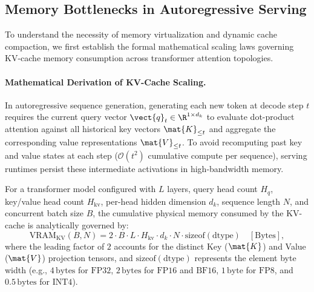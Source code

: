 \subsection{Memory Bottlenecks in Autoregressive Serving}
\label{sec:serving_memory_bottlenecks}

To understand the necessity of memory virtualization and dynamic cache compaction, we first establish the formal mathematical scaling laws governing KV-cache memory consumption across transformer attention topologies.

\paragraph{Mathematical Derivation of KV-Cache Scaling.}
In autoregressive sequence generation, generating each new token at decode step $t$ requires the current query vector $\vect{q}_t \in \R^{1 \times d_k}$ to evaluate dot-product attention against all historical key vectors $\mat{K}_{\le t}$ and aggregate the corresponding value representations $\mat{V}_{\le t}$. To avoid recomputing past key and value states at each step ($\mathcal{O}(t^2)$ cumulative compute per sequence), serving runtimes persist these intermediate activations in high-bandwidth memory.

For a transformer model configured with $L$ layers, query head count $H_q$, key/value head count $H_{\text{kv}}$, per-head hidden dimension $d_k$, sequence length $N$, and concurrent batch size $B$, the cumulative physical memory consumed by the KV-cache is analytically governed by:
\begin{equation}
\label{eq:serving:kv_cache_scaling_formula}
\text{VRAM}_{\text{KV}}(B, N) = 2 \cdot B \cdot L \cdot H_{\text{kv}} \cdot d_k \cdot N \cdot \text{sizeof}(\text{dtype}) \quad [\text{Bytes}],
\end{equation}
where the leading factor of $2$ accounts for the distinct Key ($\mat{K}$) and Value ($\mat{V}$) projection tensors, and $\text{sizeof}(\text{dtype})$ represents the element byte width (e.g., $4\,\text{bytes}$ for $\text{FP32}$, $2\,\text{bytes}$ for $\text{FP16}$ and $\text{BF16}$, $1\,\text{byte}$ for $\text{FP8}$, and $0.5\,\text{bytes}$ for $\text{INT4}$).

